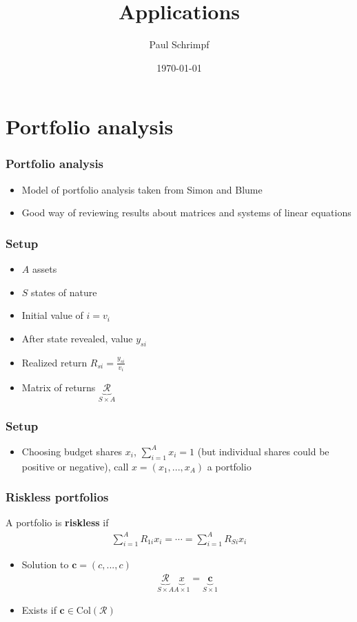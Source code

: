 \documentclass[compress]{beamer}
\title{Applications}
\author{Paul Schrimpf}
\institute{UBC \\ Economics 526}
\date{\today}
\newcommand{\col}{\mathrm{Col}}
\begin{document}
\frame{\titlepage}
\setcounter{tocdepth}{2}

\begin{frame}
  \tableofcontents  
\end{frame}

\section{Portfolio analysis}

\begin{frame}
  \frametitle{Portfolio analysis}
  \begin{itemize}
  \item Model of portfolio analysis taken from Simon and Blume
  \item Good way of reviewing results about matrices and systems of
    linear equations 
  \end{itemize}
\end{frame}

\begin{frame}
  \frametitle{Setup}
  \begin{itemize}
  \item $A$ assets
  \item $S$ states of nature
  \item Initial value of $i = v_i$
  \item After state revealed, value $y_{si}$
  \item Realized return $R_{si} = \frac{y_{si}}{v_i}$
  \item Matrix of returns $\underbrace{\mathcal{R}}_{S \times A}$
  \end{itemize}
\end{frame}

\begin{frame}
  \frametitle{Setup}
  \begin{itemize}
  \item Choosing budget shares $x_i$, $\sum_{i=1}^A x_i = 1$ (but
    individual shares could be positive or negative), call $x =
    (x_1,...,x_A)$ a portfolio
  \end{itemize}
\end{frame}

\begin{frame} \frametitle{Riskless portfolios}
  \begin{definition}
    A portfolio is \textbf{riskless} if 
    \begin{align*}
      \sum_{i=1}^A R_{1i} x_i  =  \cdots   =\sum_{i=1}^A R_{Si} x_i 
    \end{align*}
  \end{definition}
  \begin{itemize}
  \item Solution to $\mathbf{c} = (c, ..., c)$
    \begin{align*}
      \underbrace{\mathcal{R}}_{S \times A} \underbrace{x}_{A \times 1} =
      \underbrace{\mathbf{c}}_{S \times 1}
    \end{align*}
  \item Exists if $\mathbf{c} \in \col(\mathcal{R})$
  \end{itemize}
\end{frame}
\end{document}
